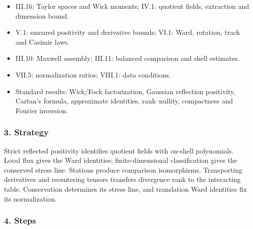 \documentclass[
  letterpaper,
  11pt]{article}
\providecommand{\tightlist}{%
  \setlength{\itemsep}{0pt}\setlength{\parskip}{0pt}}
\begin{document}
\begin{itemize}
\tightlist
\item
  III.16: Taylor spaces and Wick moments; IV.1: quotient fields,
  extraction and dimension bound.
\item
  V.1: smeared positivity and derivative bounds; VI.1: Ward, rotation,
  track and Casimir laws.
\item
  III.10: Maxwell assembly; III.11: balanced comparison and shell
  estimates.
\item
  VII.5: normalization ratios; VIII.1: data conditions.
\item
  Standard results: Wick/Fock factorization, Gaussian reflection
  positivity, Cartan's formula, approximate identities, rank--nullity,
  compactness and Fourier inversion.
\end{itemize}

\subsubsection{3. Strategy}\label{strategy-24}

Strict reflected positivity identifies quotient fields with on-shell
polynomials. Local flux gives the Ward identities; finite-dimensional
classification gives the conserved stress line. Stations produce
comparison isomorphisms. Transporting derivatives and recentering
tensors transfers divergence rank to the interacting table. Conservation
determines its stress line, and translation Ward identities fix its
normalization.

\subsubsection{4. Steps}\label{steps-24}
\end{document}
